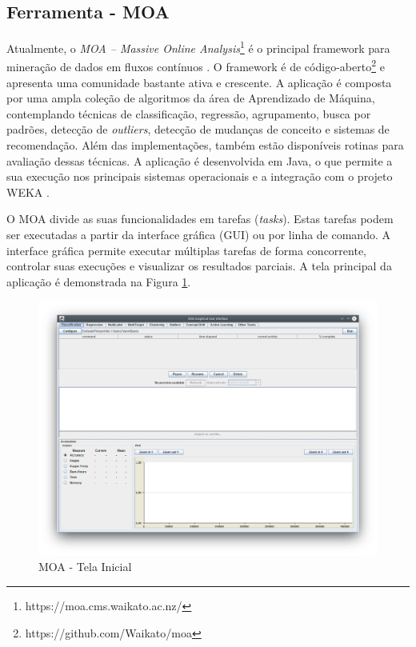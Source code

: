 \documentclass[msc, classic, a4paper]{ufbathesis}
\begin{document}
\subsection{Ferramenta - MOA}

Atualmente, o \textit{MOA – Massive Online Analysis}\footnote{https://moa.cms.waikato.ac.nz/} é o principal framework para mineração de dados em fluxos contínuos \cite{Bifet:2010:MMO:1756006.1859903}.
O framework é de código-aberto\footnote{https://github.com/Waikato/moa} e apresenta uma comunidade bastante ativa e crescente.
A aplicação é composta por uma ampla coleção de algoritmos da área de Aprendizado de Máquina, contemplando técnicas de classificação, regressão, agrupamento, busca por padrões, detecção de \textit{outliers}, detecção de mudanças de conceito e sistemas de recomendação.
Além das implementações, também estão disponíveis rotinas para avaliação dessas técnicas.
A aplicação é desenvolvida em Java, o que permite a sua execução nos principais sistemas operacionais e a integração com o projeto WEKA \cite{Hall:2009:WDM:1656274.1656278}.

O MOA divide as suas funcionalidades em tarefas (\textit{tasks}).
Estas tarefas podem ser executadas a partir da interface gráfica (GUI) ou por linha de comando.
A interface gráfica permite executar múltiplas tarefas de forma concorrente,
controlar suas execuções e visualizar os resultados parciais.
A tela principal da aplicação é demonstrada na Figura \ref{fig:moa}.

\begin{figure}[H]
\begin{center}
    \includegraphics[scale=0.4]{imagens/moa.png}
    \caption{MOA - Tela Inicial}
    \label{fig:moa}
\end{center}
\end{figure}
\end{document}

